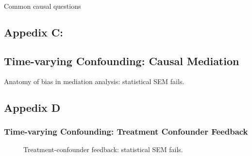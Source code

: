 \documentclass[
  single column]{article}
\begin{document}
\begin{table}

\caption{\label{tbl-common-interests}Common causal questions}

\centering{

\terminologyeffectmodificationtypes

}

\end{table}%

\newpage{}

\subsection{Appedix C:}\label{appedix-c}

\subsection{Time-varying Confounding: Causal
Mediation}\label{time-varying-confounding-causal-mediation}

\begin{table}

\caption{\label{tbl-mediation}Anatomy of bias in mediation analysis:
statistical SEM fails.}

\centering{

\mediationfull

}

\end{table}%

\newpage{}

\subsection{Appedix D}\label{appedix-d}

\subsubsection{Time-varying Confounding: Treatment Confounder
Feedback}\label{time-varying-confounding-treatment-confounder-feedback}

\begin{figure}

\centering{

\feedbackA

}

\caption{\label{fig-timevarying-amplification}Treatment-confounder
feedback: statistical SEM fails.}

\end{figure}%
\end{document}
